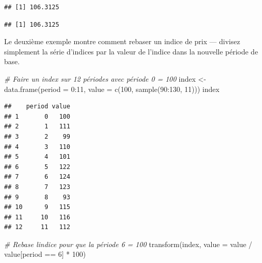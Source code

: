 \documentclass[
]{article}
\newenvironment{Shaded}{\begin{snugshade}}{\end{snugshade}}
\newcommand{\AttributeTok}[1]{\textcolor[rgb]{0.77,0.63,0.00}{#1}}
\newcommand{\CommentTok}[1]{\textcolor[rgb]{0.56,0.35,0.01}{\textit{#1}}}
\newcommand{\DecValTok}[1]{\textcolor[rgb]{0.00,0.00,0.81}{#1}}
\newcommand{\FunctionTok}[1]{\textcolor[rgb]{0.00,0.00,0.00}{#1}}
\newcommand{\NormalTok}[1]{#1}
\newcommand{\OtherTok}[1]{\textcolor[rgb]{0.56,0.35,0.01}{#1}}
\newcommand{\SpecialCharTok}[1]{\textcolor[rgb]{0.00,0.00,0.00}{#1}}
\begin{document}
\begin{verbatim}
## [1] 106.3125
\end{verbatim}

\begin{Shaded}
\end{Shaded}

\begin{verbatim}
## [1] 106.3125
\end{verbatim}

Le deuxième exemple montre comment rebaser un indice de prix --- divisez simplement la série d'indices par la valeur de l'indice dans la nouvelle période de base.

\begin{Shaded}
\begin{Highlighting}[]
\CommentTok{\# Faire un index sur 12 périodes avec période 0 = 100}
\NormalTok{index }\OtherTok{\textless{}{-}} \FunctionTok{data.frame}\NormalTok{(}\AttributeTok{period =} \DecValTok{0}\SpecialCharTok{:}\DecValTok{11}\NormalTok{, }\AttributeTok{value =} \FunctionTok{c}\NormalTok{(}\DecValTok{100}\NormalTok{, }\FunctionTok{sample}\NormalTok{(}\DecValTok{90}\SpecialCharTok{:}\DecValTok{130}\NormalTok{, }\DecValTok{11}\NormalTok{)))}
\NormalTok{index}
\end{Highlighting}
\end{Shaded}

\begin{verbatim}
##    period value
## 1       0   100
## 2       1   111
## 3       2    99
## 4       3   110
## 5       4   101
## 6       5   122
## 7       6   124
## 8       7   123
## 9       8    93
## 10      9   115
## 11     10   116
## 12     11   112
\end{verbatim}

\begin{Shaded}
\begin{Highlighting}[]
\CommentTok{\# Rebase l\textquotesingle{}indice pour que la période 6 = 100}
\FunctionTok{transform}\NormalTok{(index, }\AttributeTok{value =}\NormalTok{ value }\SpecialCharTok{/}\NormalTok{ value[period }\SpecialCharTok{==} \DecValTok{6}\NormalTok{] }\SpecialCharTok{*} \DecValTok{100}\NormalTok{)}
\end{Highlighting}
\end{Shaded}
\end{document}
